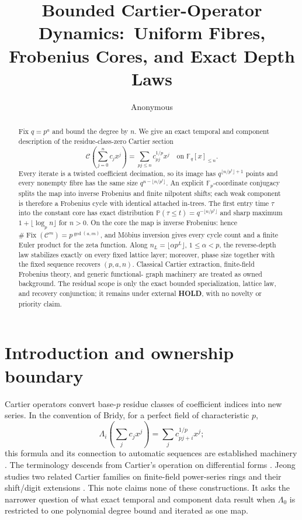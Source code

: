 \documentclass[10pt,a4paper]{amsart}
\title[Bounded Cartier-operator dynamics]{Bounded Cartier-Operator Dynamics:\ Uniform Fibres, Frobenius Cores, and Exact Depth Laws}
\author{Anonymous}
\date{}
\theoremstyle{definition}
\theoremstyle{remark}
\newcommand{\F}{\mathbb F}
\newcommand{\Prob}{\mathbb P}
\newcommand{\Fix}{\operatorname{Fix}}
\begin{document}
\begin{abstract}
Fix $q=p^a$ and bound the degree by $n$.  We give an exact temporal and
component description of the residue-class-zero Cartier section
\[
 \mathcal C\!\left(\sum_{j=0}^{n}c_jx^j\right)
   =\sum_{pj\le n}c_{pj}^{1/p}x^j
 \quad\text{on }\F_q[x]_{\le n}.
\]
Every iterate is a twisted coefficient decimation, so its image has
$q^{\lfloor n/p^t\rfloor+1}$ points and every nonempty fibre has the same
size $q^{n-\lfloor n/p^t\rfloor}$.  An explicit $\F_p$-coordinate
conjugacy splits the map into inverse Frobenius and finite nilpotent shifts;
each weak component is therefore a Frobenius cycle with identical attached
in-trees.  The first entry time $\tau$ into the constant core has exact distribution
$\Prob(\tau\le t)=q^{-\lfloor n/p^t\rfloor}$ and sharp maximum
$1+\lfloor\log_p n\rfloor$ for $n>0$.  On the core the map is inverse
Frobenius: hence $\#\Fix(\mathcal C^m)=p^{\gcd(a,m)}$, and M\"obius
inversion gives every cycle count and a finite Euler product for the zeta
function.  Along $n_L=\lfloor\alpha p^L\rfloor$, $1\le\alpha<p$, the
reverse-depth law stabilizes exactly on every fixed lattice layer; moreover,
phase size together with the fixed sequence recovers $(p,a,n)$.  Classical
Cartier extraction, finite-field Frobenius theory, and generic functional-
graph machinery are treated as owned background.  The residual scope is only
the exact bounded specialization, lattice law, and recovery conjunction; it
remains under external \textbf{HOLD}, with no novelty or priority claim.
\end{abstract}

\maketitle

\section{Introduction and ownership boundary}
\label{sec:introduction}

Cartier operators convert base-$p$ residue classes of coefficient indices
into new series.  In the convention of Bridy, for a perfect field of
characteristic $p$,
\[
 \Lambda_i\!\left(\sum_j c_jx^j\right)
   =\sum_j c_{pj+i}^{1/p}x^j;
\]
this formula and its connection to automatic sequences are established
machinery \cite[Eq.~(2.7)]{Bridy2017}.  The terminology descends from
Cartier's operation on differential forms \cite{Cartier1957}.  Jeong studies
two related Cartier families on finite-field power-series rings and their
shift/digit extensions \cite{Jeong2018}.  This note claims none of these
constructions.  It asks the narrower question of what exact temporal and
component data result when $\Lambda_0$ is restricted to one polynomial
degree bound and iterated as one map.
\end{document}
